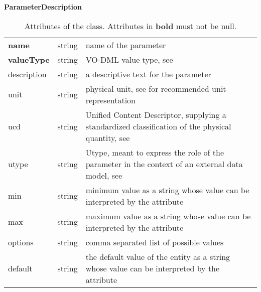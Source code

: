 \begin{table}[ht]
\small
{}\textwidth
\textbf{\normalsize ParameterDescription}\vspace{0.25em}\\
\begin{tabulary}{1.0\textwidth}{lLL}
 \toprule
  &    & \\
 \midrule
\textbf{name} & string & name of the parameter \\
\textbf{valueType} & string & VO-DML value type, see \citet{2018ivoa.spec.0910L} \\
description & string  & a descriptive text for the parameter \\
unit        & string  & physical unit, see \citet{2014ivoa.spec.0523D} for recommended unit representation \\
ucd         & string  & Unified Content Descriptor, supplying a standardized classification of the physical quantity, see \citet{2018ivoa.spec.0527M} \\
utype       & string  & Utype, meant to express the role of the parameter in the context of an external data model, see \citet{note:utypeusage} \\
min         & string & minimum value as a string whose value can be interpreted by the  attribute \\
max         & string & maximum value as a string whose value can be interpreted by the  attribute\\
options     & string & comma separated list of possible values\\
default     & string & the default value of the entity as a string whose value can be interpreted by the  attribute \\
\bottomrule
\end{tabulary}
\caption[Attributes of the  class]{Attributes of the   class. Attributes in \textbf{bold} must not be null.}
\label{tab:Paramdescription}
\end{table}

